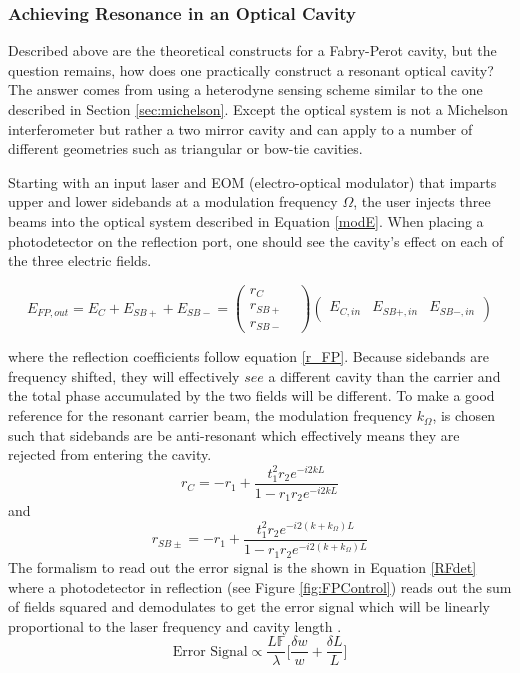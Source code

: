 		\subsubsection{Achieving Resonance in an Optical Cavity}
		Described above are the theoretical constructs for a Fabry-Perot cavity, but the question remains, how does one practically construct a resonant optical cavity?  The answer comes from using a heterodyne sensing scheme similar to the one described in Section \ref{sec:michelson}.  Except the optical system is not a Michelson interferometer but rather a two mirror cavity and can apply to a number of different geometries such as triangular or bow-tie cavities.
		
		Starting with an input laser and EOM (electro-optical modulator) that imparts upper and lower sidebands at a modulation frequency $\Omega$, the user injects three beams into the optical system described in Equation \ref{modE}.  When placing a photodetector on the reflection port, one should see the cavity's effect on each of the three electric fields.
		
		\begin{equation}
		E_{FP,out} = E_{C} + E_{SB+} + E_{SB-} = 
		\begin{pmatrix}
		r_{C} 	&   
		\\ 	r_{SB+} &
		\\ 	r_{SB-} &
		\end{pmatrix}
		\begin{pmatrix}
		E_{C,in} &    E_{SB+,in}    &  E_{SB-,in}     
		\end{pmatrix}
		\end{equation}
		
		where the reflection coefficients follow equation \ref{r_FP}.  Because sidebands are frequency shifted, they will effectively $see$ a different cavity than the carrier and the total phase accumulated by the two fields will be different. To make a good reference for the resonant carrier beam, the modulation frequency $k_{\Omega}$, is chosen such that sidebands are be anti-resonant which effectively means they are rejected from entering the cavity.
		\begin{equation}
		r_{C} = -r_1 + \frac{t_1^2 r_2  e^{-i2kL}}{1-r_1 r_2 e^{-i2kL}}
		\end{equation}
		and 
		\begin{equation}
		r_{SB\pm} = -r_1 + \frac{t_1^2 r_2  e^{-i2(k+k_{\Omega})L}}{1-r_1 r_2 e^{-i2(k+k_{\Omega})L}}
		\end{equation}
		The formalism to read out the error signal is the shown in Equation \ref{RFdet} where a photodetector in reflection (see Figure \ref{fig:FPControl}) reads out the sum of fields squared and demodulates to get the error signal which will be linearly proportional to the laser frequency and cavity length \cite{BlackPDH}.
		\begin{equation}
		\text{Error Signal} \propto \frac{L \mathbb{F}}{\lambda} \bigg[\frac{\delta w}{w} + \frac{\delta L}{L}\bigg]
		\end{equation}
		
